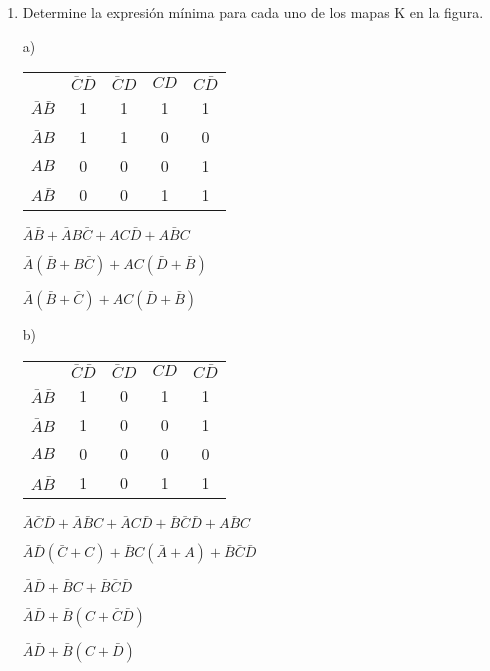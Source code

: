 \documentclass[a4paper, 12pt]{article}
\newcommand{\Aspace}{0.2cm}
\begin{document}
\begin{enumerate}
        \newpage
        \item Determine la expresión mínima para cada uno de los mapas K en la figura. \par
            \vspace{\Aspace} \par
            a) 
            \begin{tabular}{ccccc}
                & $\bar{C}\bar{D}$ & $\bar{C}D$ & $CD$ & $C\bar{D}$ \\
                $\bar{A}\bar{B}$ & 1 & 1 & 1 & 1 \\
                $\bar{A}B$ & 1 & 1 & 0 & 0 \\
                $AB$ & 0 & 0 & 0 & 1 \\
                $A \bar{B}$ & 0 & 0 & 1 & 1
            \end{tabular}

            \par { \color{azul} 
                $\bar{A}\bar{B} + \bar{A}B\bar{C} + AC\bar{D} + A\bar{B}C$
                \par $\bar{A}(\bar{B} + B\bar{C}) + AC(\bar{D} + \bar{B})$
                \par $\bar{A}(\bar{B} + \bar{C}) + AC(\bar{D} + \bar{B})$
            }

            \vspace{\Aspace} \par
            b) 
            \begin{tabular}{ccccc}
                & $\bar{C}\bar{D}$ & $\bar{C}D$ & $CD$ & $C\bar{D}$ \\
                $\bar{A}\bar{B}$ & 1 & 0 & 1 & 1 \\
                $\bar{A}B$ & 1 & 0 & 0 & 1 \\
                $AB$ & 0 & 0 & 0 & 0 \\
                $A \bar{B}$ & 1 & 0 & 1 & 1
            \end{tabular}

            \par { \color{azul} 
                $\bar{A}\bar{C}\bar{D} + \bar{A}\bar{B}C + \bar{A}C\bar{D} + \bar{B}\bar{C}\bar{D} + A\bar{B}C$
                \par $\bar{A}\bar{D}(\bar{C} + C) + \bar{B}C(\bar{A} + A) + \bar{B}\bar{C}\bar{D}$
                \par $\bar{A}\bar{D} + \bar{B}C + \bar{B}\bar{C}\bar{D}$
                \par $\bar{A}\bar{D} + \bar{B}(C + \bar{C}\bar{D})$
                \par $\bar{A}\bar{D} + \bar{B}(C + \bar{D})$
            }




\end{enumerate}
\end{document}
